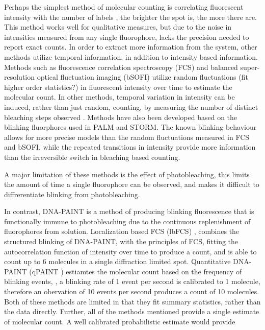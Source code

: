 Perhaps the simplest method of molecular counting is correlating fluorescent
  intensity with the number of labels \cite{schmied_2012, tolar_2005}, \ie the brighter the spot is, the more there are.
  This method works well for qualitative measures, but due to the noise in intensities 
  measured from any single fluorophore, lacks the precision needed to report exact counts.
  In order to extract more information from the system, other methods utilize temporal information, 
  in addition to intensity based information. 
  Methods such as fluorescence correlation spectroscopy (FCS) \cite{otsuka_2023, wachsmuth_2015, politi_2018} and 
  balanced super-resolution optical fluctuation imaging (bSOFI) \cite{geissbuehler_2012}
  utilize random fluctuations (fit higher order statistics?) in fluorescent intensity over time to estimate the molecular count.
  In other methods, temporal variation in intensity can be induced, rather than just random, \ie
  counting, by measuring the number of distinct bleaching steps observed \cite{ulbrich_2007, jain_2011}.
  Methods have also been developed based on the blinking fluorphores used in PALM and STORM. 
  The known blinking behaviour allows for more precise models than the random fluctuations measured in FCS and bSOFI, while the 
  repeated transitions in intensity provide more information than the irreversible switch in bleaching based counting.


  A major limitation of these methods is the effect of photobleaching, this limits the amount of time
  a single fluorophore can be observed, and makes it difficult to diffrerentiate blinking from photobleaching.


In contrast, DNA-PAINT \cite{schnitzbauer_2017} is a method of producing blinking fluorescence that is functionally
    immune to photobleaching due to the continuous replenishment of fluorophores from solution.
    Localization based FCS (lbFCS) \cite{stein_2021}, combines the structured blinking of DNA-PAINT, with the 
    principles of FCS, fitting the autocorrelation function of intensity over time to produce a count,
    and is able to count up to 6 molecules in a single diffraction limited spot.
    Quantitative DNA-PAINT (qPAINT \cite{jungmann_2016}) estiamtes the molecular count based on the frequency of blinking events, \ie, 
    a blinking rate of 1 event per second is calibrated to 1 molecule, therefore an obervation of 10 events per second
    produces a count of 10 molecules.
    Both of these methods are limited in that they fit summary statistics,
    rather than the data directly. 
    Further, all of the methods mentioned provide a single estimate of molecular count.
    A well calibrated probabilistic estimate would provide 
    
